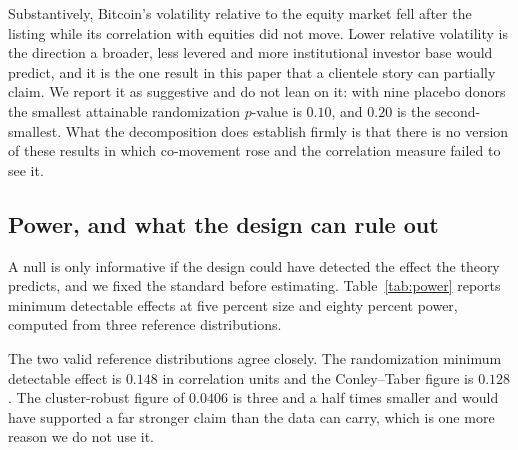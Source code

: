 \documentclass[12pt,a4paper]{article}
\begin{document}
Substantively, Bitcoin's volatility relative to the equity market fell after the listing while its correlation with equities did not move. Lower relative volatility is the direction a broader, less levered and more institutional investor base would predict, and it is the one result in this paper that a clientele story can partially claim. We report it as suggestive and do not lean on it: with nine placebo donors the smallest attainable randomization $p$-value is $0.10$, and $0.20$ is the second-smallest. What the decomposition does establish firmly is that there is no version of these results in which co-movement rose and the correlation measure failed to see it.

\subsection{Power, and what the design can rule out}

A null is only informative if the design could have detected the effect the theory predicts, and we fixed the standard before estimating. Table~\ref{tab:power} reports minimum detectable effects at five percent size and eighty percent power, computed from three reference distributions.



The two valid reference distributions agree closely. The randomization minimum detectable effect is
$0.148$ in correlation units and the Conley--Taber figure is
$0.128$. The cluster-robust figure of
$0.0406$ is three and a half times smaller and would have supported a far stronger claim than the data can carry, which is one more reason we do not use it.
\end{document}
